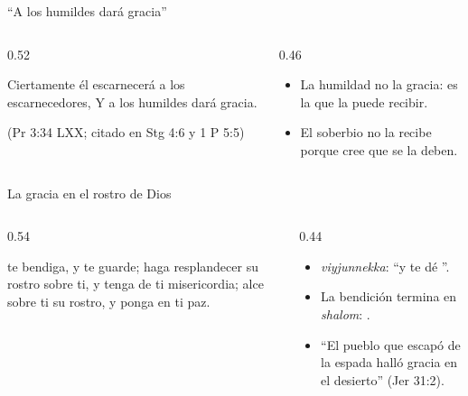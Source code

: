 \begin{frame}{``A los humildes dará gracia''}
\begin{columns}[c,onlytextwidth]
\begin{column}{0.52\textwidth}
\centering{}
\begin{cita}Ciertamente él escarnecerá a los escarnecedores, Y a los humildes dará gracia.\end{cita}
\centering{}\par
{\scriptsize\color{gris}(Pr 3:34 LXX; citado en Stg 4:6 y 1 P 5:5)}
\end{column}
\begin{column}{0.46\textwidth}\small\RaggedRight
\begin{itemize}
\item La humildad no  la gracia: es la  que la puede recibir.
\item El soberbio no la recibe porque cree que se la deben.
\end{itemize}
\end{column}
\end{columns}
\end{frame}

\begin{frame}{La gracia en el rostro de Dios}
\begin{columns}[c,onlytextwidth]
\begin{column}{0.54\textwidth}
\centering{}
\begin{cita}\SENOR{} te bendiga, y te guarde; \SENOR{} haga resplandecer su rostro sobre ti, y tenga de ti misericordia; \SENOR{} alce sobre ti su rostro, y ponga en ti paz.\end{cita}
\end{column}
\begin{column}{0.44\textwidth}\small\RaggedRight
\begin{itemize}
\item {} \emph{viyjunnekka}: ``y te dé ''.
\item La bendición termina en \emph{shalom}: .
\item ``El pueblo que escapó de la espada halló gracia en el desierto'' (Jer 31:2).
\end{itemize}
\end{column}
\end{columns}
\end{frame}

